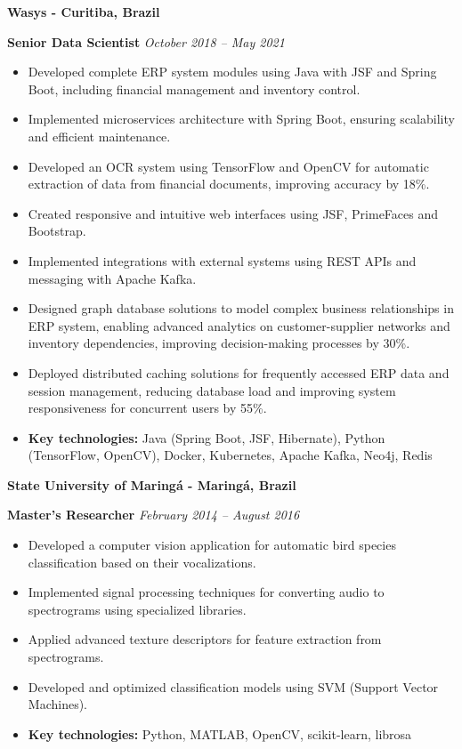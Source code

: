 \documentclass[12pt,a4paper,sans]{moderncv}        %
\begin{document}
\vspace{24pt}
\small{\textbf{Wasys - Curitiba, Brazil}}
\vspace{3pt}

\textbf{Senior Data Scientist} \hfill \textit{October 2018 -- May 2021}
\begin{itemize}
    \item Developed complete ERP system modules using Java with JSF and Spring Boot, including financial management and inventory control.
    \item Implemented microservices architecture with Spring Boot, ensuring scalability and efficient maintenance.
    \item Developed an OCR system using TensorFlow and OpenCV for automatic extraction of data from financial documents, improving accuracy by 18\%.
    \item Created responsive and intuitive web interfaces using JSF, PrimeFaces and Bootstrap.
    \item Implemented integrations with external systems using REST APIs and messaging with Apache Kafka.
    \item Designed graph database solutions to model complex business relationships in ERP system, enabling advanced analytics on customer-supplier networks and inventory dependencies, improving decision-making processes by 30\%.
    \item Deployed distributed caching solutions for frequently accessed ERP data and session management, reducing database load and improving system responsiveness for concurrent users by 55\%.
    \item \textbf{Key technologies:} Java (Spring Boot, JSF, Hibernate), Python (TensorFlow, OpenCV), Docker, Kubernetes, Apache Kafka, Neo4j, Redis
\end{itemize}

\vspace{24pt}
\small{\textbf{State University of Maringá - Maringá, Brazil}}
\vspace{3pt}

\textbf{Master's Researcher} \hfill \textit{February 2014 -- August 2016}
\begin{itemize}
    \item Developed a computer vision application for automatic bird species classification based on their vocalizations.
    \item Implemented signal processing techniques for converting audio to spectrograms using specialized libraries.
    \item Applied advanced texture descriptors for feature extraction from spectrograms.
    \item Developed and optimized classification models using SVM (Support Vector Machines).
    \item \textbf{Key technologies:} Python, MATLAB, OpenCV, scikit-learn, librosa
\end{itemize}
\end{document}
